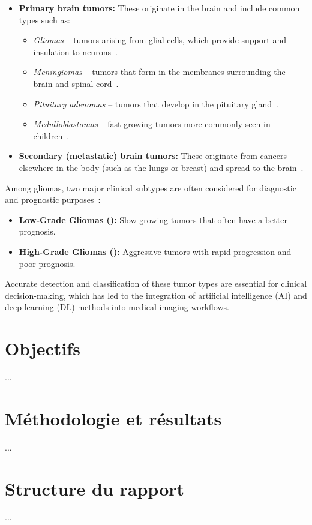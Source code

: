 \begin{itemize}
  \item \textbf{Primary brain tumors:} These originate in the brain and include common types such as:
        \begin{itemize}
          \item \textit{Gliomas} – tumors arising from glial cells, which provide support and insulation to neurons~\cite{louis2016who}.
          \item \textit{Meningiomas} – tumors that form in the membranes surrounding the brain and spinal cord~\cite{mayo_clinic}.
          \item \textit{Pituitary adenomas} – tumors that develop in the pituitary gland~\cite{mayo_clinic}.
          \item \textit{Medulloblastomas} – fast-growing tumors more commonly seen in children~\cite{cancer_gov}.
        \end{itemize}

  \item \textbf{Secondary (metastatic) brain tumors:} These originate from cancers elsewhere in the body (such as the lungs or breast) and spread to the brain~\cite{cancer_gov}.
\end{itemize}

Among gliomas, two major clinical subtypes are often considered for diagnostic and prognostic purposes~\cite{louis2016who}:

\begin{itemize}
  \item \textbf{Low-Grade Gliomas ():} Slow-growing tumors that often have a better prognosis.
  \item \textbf{High-Grade Gliomas ():} Aggressive tumors with rapid progression and poor prognosis.
\end{itemize}

Accurate detection and classification of these tumor types are essential for clinical decision-making, which has led to the integration of artificial intelligence (AI) and deep learning (DL) methods into medical imaging workflows.


\section{Objectifs}
...
\section{Méthodologie et résultats }
...
\section{Structure du rapport}
...